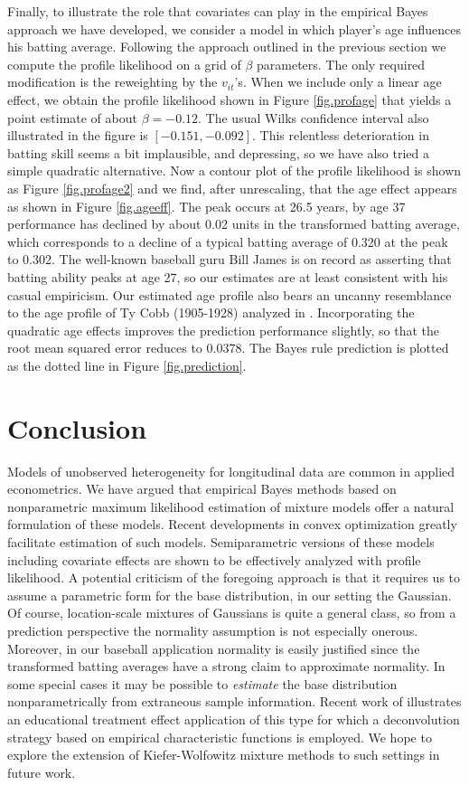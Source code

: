 \documentclass[12pt]{amsart}
\begin{document}
Finally, to illustrate the role that covariates can play in the empirical Bayes approach
we have developed, we consider a model in which player's age influences his batting average.
Following the approach outlined in the previous section we compute the profile likelihood
on a grid of $\beta$ parameters.  The only required modification is the reweighting by the
$v_{it}$'s.  When we include only a linear age effect, we obtain the profile likelihood
shown in Figure \ref{fig.profage} that yields a point estimate of about $\beta = -0.12$.
The usual Wilks confidence interval also illustrated in the figure is $[-0.151, -0.092]$.  This relentless
deterioration in batting skill seems a bit implausible, and depressing, so we have also
tried a simple quadratic alternative.  Now a contour plot of the profile likelihood is
shown as Figure \ref{fig.profage2} and we find, after unrescaling,  that the age effect appears
as shown in Figure \ref{fig.ageeff}.  The peak occurs at 26.5 years, by age 37 performance
has declined by about 0.02 units in the transformed batting average, which corresponds to a
decline of a typical batting average of 0.320 at the peak to 0.302.  The well-known baseball 
guru Bill James is on record as asserting that batting ability peaks at age 27, so our estimates
are at least consistent with his casual empiricism.  Our estimated age profile also bears an
uncanny resemblance to the age profile of Ty Cobb (1905-1928) analyzed in . Incorporating the quadratic age effects improves the prediction performance 
slightly, so that the root mean squared error reduces to 0.0378. The Bayes rule 
prediction is plotted as the dotted line in Figure \ref{fig.prediction}.

\section{Conclusion}

Models of unobserved heterogeneity for longitudinal data are common in applied econometrics.
We have argued that empirical Bayes methods based on nonparametric maximum likelihood estimation 
of mixture models offer a natural formulation of these models.  Recent developments in convex
optimization greatly facilitate estimation of such models.  Semiparametric versions of these
models including covariate effects are shown to be effectively analyzed with profile likelihood.  
A potential criticism of the foregoing approach is that it requires us to assume a parametric
form for the base distribution, in our setting the Gaussian.  Of course, location-scale mixtures
of Gaussians is quite a general class, so from a prediction perspective the normality assumption
is not especially onerous.  Moreover, in our baseball application normality is easily justified
since the transformed batting averages have a strong claim to approximate normality.  In some
special cases it may be possible to {\it estimate} the base distribution nonparametrically from
extraneous sample information.  Recent work of  illustrates an educational treatment effect
application of this type for which a deconvolution strategy based on empirical characteristic functions
is employed.   We hope to explore the extension of Kiefer-Wolfowitz mixture methods to such settings
in future work.
\end{document}
